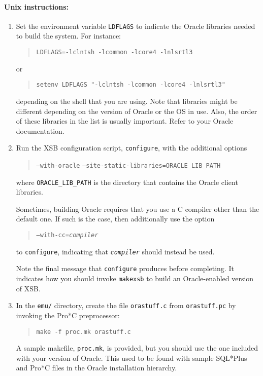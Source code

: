 \paragraph{Unix instructions:}
\begin{enumerate}
\item Set the environment variable {\tt LDFLAGS} to indicate the
Oracle libraries needed to build the system.  For instance:
\begin{quote}
	\texttt{LDFLAGS=-lclntsh -lcommon -lcore4 -lnlsrtl3}
\end{quote}
or
\begin{quote}
	\texttt{setenv LDFLAGS "-lclntsh -lcommon -lcore4 -lnlsrtl3"}
\end{quote}
depending on the shell that you are using.  Note that libraries might
be different depending on the version of Oracle or the OS in use.
Also, the order of these libraries in the list is usually important.
Refer to your Oracle documentation.

\item Run the XSB configuration script, {\tt configure}, with the
additional options
\begin{quote}
	{\tt --with-oracle}\quad
	{\tt --site-static-libraries=ORACLE\_LIB\_PATH}
\end{quote}
where {\tt ORACLE\_LIB\_PATH} is the directory that contains the Oracle
client libraries.

Sometimes, building Oracle requires that you use a C compiler other
than the default one.  If such is the case, then additionally use the
option
\begin{quote}
	{\tt --with-cc=\emph{compiler}}
\end{quote}
to \texttt{configure}, indicating that \emph{\texttt{compiler}} should
instead be used.

Note the final message that {\tt configure} produces before
completing.  It indicates how you should invoke \texttt{makexsb} to
build an Oracle-enabled version of XSB\@.

\item In the \texttt{emu/} directory, create the file
\texttt{orastuff.c} from \texttt{orastuff.pc} by invoking the Pro*C
preprocessor:
\begin{quote}
	{\tt make -f proc.mk orastuff.c}
\end{quote}
A sample makefile, \texttt{proc.mk}, is provided, but you should use
the one included with your version of Oracle.  This used to be found
with sample SQL*Plus and Pro*C files in the Oracle installation
hierarchy.


\end{enumerate}
